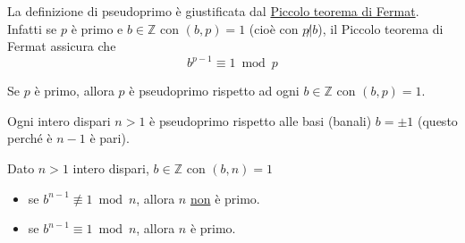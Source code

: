 \documentclass[a4paper,12pt, oneside]{book}
\begin{document}
\begin{osservazione}
	La definizione di pseudoprimo è giustificata dal \underline{Piccolo teorema di Fermat}.\\
	Infatti se $p$ è primo e $b \in \mathbb{Z}$ con $(b,p)=1$ (cioè con $p \not | b$), il Piccolo teorema di Fermat assicura che
	$$b^{p-1} \equiv 1 \bmod p$$
\end{osservazione}

\begin{osservazione}
	Se $p$ è primo, allora $p$ è pseudoprimo rispetto ad ogni $b \in \mathbb{Z}$ con $(b,p)=1$.
\end{osservazione}

\begin{osservazione}
	Ogni intero dispari $n>1$ è pseudoprimo rispetto alle basi (banali) $b=\pm1$ (questo perché è $n-1$ è pari).
\end{osservazione}

\begin{nota}
	Dato $n>1$ intero dispari, $b \in \mathbb{Z}$ con $(b,n)=1$
	\begin{itemize}
		\item se $b^{n-1} \not\equiv 1 \bmod n$, allora $n$ \underline{non} è primo.
		\item se $b^{n-1} \equiv 1 \bmod n$, allora $n$ è primo.
	\end{itemize}
\end{nota}
\end{document}
